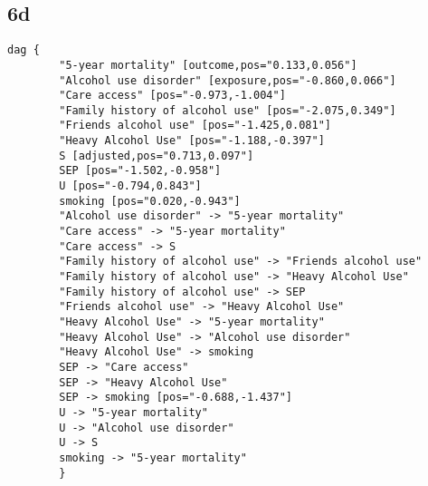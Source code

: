 \documentclass{article}
\begin{document}
\subsection*{6d}
\begin{lstlisting}[frame=single, basicstyle=\ttfamily, linewidth=20.5cm]
    dag {
        "5-year mortality" [outcome,pos="0.133,0.056"]
        "Alcohol use disorder" [exposure,pos="-0.860,0.066"]
        "Care access" [pos="-0.973,-1.004"]
        "Family history of alcohol use" [pos="-2.075,0.349"]
        "Friends alcohol use" [pos="-1.425,0.081"]
        "Heavy Alcohol Use" [pos="-1.188,-0.397"]
        S [adjusted,pos="0.713,0.097"]
        SEP [pos="-1.502,-0.958"]
        U [pos="-0.794,0.843"]
        smoking [pos="0.020,-0.943"]
        "Alcohol use disorder" -> "5-year mortality"
        "Care access" -> "5-year mortality"
        "Care access" -> S
        "Family history of alcohol use" -> "Friends alcohol use"
        "Family history of alcohol use" -> "Heavy Alcohol Use"
        "Family history of alcohol use" -> SEP
        "Friends alcohol use" -> "Heavy Alcohol Use"
        "Heavy Alcohol Use" -> "5-year mortality"
        "Heavy Alcohol Use" -> "Alcohol use disorder"
        "Heavy Alcohol Use" -> smoking
        SEP -> "Care access"
        SEP -> "Heavy Alcohol Use"
        SEP -> smoking [pos="-0.688,-1.437"]
        U -> "5-year mortality"
        U -> "Alcohol use disorder"
        U -> S
        smoking -> "5-year mortality"
        }
        
\end{lstlisting}
\end{document}

